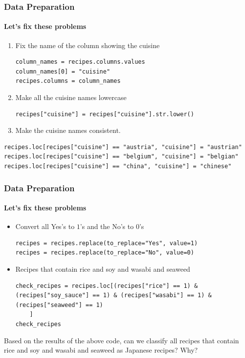 \documentclass{beamer}
\begin{document}
\begin{frame}[fragile]
	\frametitle{Data Preparation}
	\framesubtitle{Let's fix these problems}
	\begin{enumerate}
		\item Fix the name of the column showing the cuisine
		\begin{lstlisting}
column_names = recipes.columns.values
column_names[0] = "cuisine"
recipes.columns = column_names
		\end{lstlisting}
		\item Make all the cuisine names lowercase
		\begin{lstlisting}
recipes["cuisine"] = recipes["cuisine"].str.lower()
		\end{lstlisting}
	\item Make the cuisine names consistent.
	\end{enumerate}
\begin{lstlisting}
recipes.loc[recipes["cuisine"] == "austria", "cuisine"] = "austrian"
recipes.loc[recipes["cuisine"] == "belgium", "cuisine"] = "belgian"
recipes.loc[recipes["cuisine"] == "china", "cuisine"] = "chinese"
\end{lstlisting}
\end{frame}



\begin{frame}[fragile]
	\frametitle{Data Preparation}
	\framesubtitle{Let's fix these problems}
\begin{itemize}
	\item Convert all Yes's to $1$'s and the No's to $0$'s
	\begin{lstlisting}
recipes = recipes.replace(to_replace="Yes", value=1)
recipes = recipes.replace(to_replace="No", value=0)
	\end{lstlisting}
\item Recipes that contain rice and soy and wasabi and seaweed
\begin{lstlisting}
check_recipes = recipes.loc[(recipes["rice"] == 1) & (recipes["soy_sauce"] == 1) & (recipes["wasabi"] == 1) & (recipes["seaweed"] == 1)
	]
check_recipes
\end{lstlisting}
\end{itemize}
Based on the results of the above code, can we classify all recipes that contain rice and soy and wasabi and seaweed as Japanese recipes? Why?
\end{frame}
\end{document}
